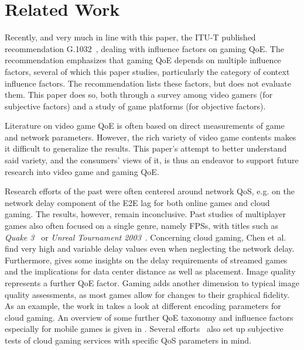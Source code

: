 \section{Related Work}
\label{sec:relatedwork}

Recently, and very much in line with this paper, the \acrshort{ITU-T}
published recommendation G.1032~\cite{mollertowards, itutg1032}, dealing with
influence factors on gaming \gls{QoE}.
The recommendation emphasizes that gaming \gls{QoE} depends on multiple
influence factors, several of which this paper studies,
particularly the category of context influence factors.
The recommendation lists these factors,
but does not evaluate them. This paper does so, both through a survey
among video gamers (for subjective factors) and a study of
game platforms (for objective factors).

Literature on video game \gls{QoE} is often based on
direct measurements of game and network parameters. However, the
rich variety of video game contents makes it difficult to generalize
the results. This paper's attempt to better understand said variety,
and the consumers' views of it, is thus an endeavor to support future
research into video game and gaming \gls{QoE}.

Research efforts of the past were often centered around network \acrshort{QoS}, e.g. on the network delay component of the \gls{E2E} lag for both online games and cloud gaming. The results, however, remain inconclusive. Past studies of multiplayer games also often focused on a single genre, namely \glspl{FPS}, with titles such as \textit{Quake 3}~\cite{1266180} or \textit{Unreal Tournament 2003}~\cite{Beigbeder:2004:ELL:1016540.1016556}. Concerning cloud gaming, Chen et al.~\cite{6670099} find very high and variable delay values even when neglecting the network delay. Furthermore, \cite{Choy:2012:BSC:2501560.2501563} gives some insights on the delay requirements of streamed games and the implications for data center distance as well as placement.
Image quality represents a further \gls{QoE} factor. Gaming adds
another dimension to typical image quality assessments, as most
games allow for changes to their graphical fidelity.
As an example, the work in \cite{slivarimpact} takes a look at different encoding parameters for cloud gaming. %
An overview of some further \gls{QoE} taxonomy and influence factors especially for mobile games is given in \cite{beyer2014typedisplaydelayimpact}.
Several efforts~\cite{Jarschel20132883,6614351} also set up
subjective tests of cloud gaming services with specific \gls{QoS}
parameters in mind.

